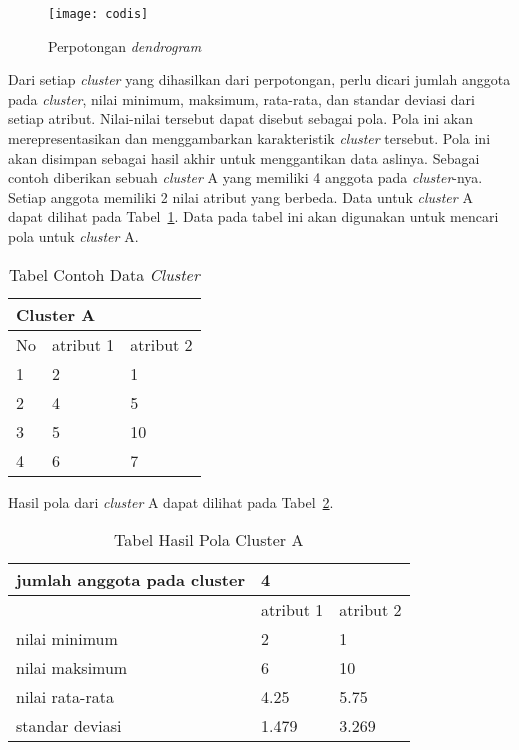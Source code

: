\begin{figure}[H]
    \centering  
    \texttt{[image: codis]}  
    \caption[Perpotongan \textit{dendrogram} ]{Perpotongan \textit{dendrogram}} 
    \label{fig:codis} 
\end{figure}

Dari setiap \textit{cluster} yang dihasilkan dari perpotongan, perlu dicari jumlah anggota pada \textit{cluster}, nilai minimum, maksimum, rata-rata, dan standar deviasi dari setiap atribut. Nilai-nilai tersebut dapat disebut sebagai pola. Pola ini akan merepresentasikan dan menggambarkan karakteristik \textit{cluster} tersebut. Pola ini akan disimpan sebagai hasil akhir untuk menggantikan data aslinya. Sebagai contoh diberikan sebuah \textit{cluster} A yang memiliki 4 anggota pada \textit{cluster}-nya. Setiap anggota memiliki 2 nilai atribut yang berbeda. Data untuk \textit{cluster} A dapat dilihat pada Tabel~\ref{tab:cont1}. Data pada tabel ini akan digunakan untuk mencari pola untuk \textit{cluster} A.


\begin{table}[H]
    \centering 
    \caption{Tabel Contoh Data \textit{Cluster}}
    \label{tab:cont1}
\begin{tabular}{|p{2cm}|p{2.2cm}|p{2.5cm}|}
\hline
\multicolumn{3}{|l|}{Cluster A}  \\
\hline
No & atribut 1 & atribut 2     \\
\hline
1  & 2         & 1             \\
\hline
2  & 4         & 5             \\
\hline
3  & 5         & 10            \\
\hline
4  & 6         & 7            \\
\hline
\end{tabular}
\end{table}

Hasil pola dari \textit{cluster} A dapat dilihat pada Tabel~\ref{tab:cont2}.



\begin{table}[H]
\centering 
    \caption{Tabel Hasil Pola Cluster A}
    \label{tab:cont2}
\begin{tabular}{|p{5cm}|p{2.5cm}|p{2.5cm}|}
\hline
jumlah anggota pada cluster & \multicolumn{2}{l|}{4}  \\
\hline
                            & atribut 1 & atribut 2  \\
\hline
nilai minimum               & 2         & 1          \\
\hline
nilai maksimum              & 6         & 10          \\
\hline
nilai rata-rata             & 4.25      & 5.75        \\
\hline
standar deviasi             & 1.479        & 3.269 \\   
\hline     
\end{tabular}
\end{table}




